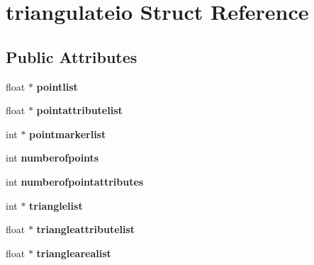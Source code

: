 \hypertarget{structtriangulateio}{\section{triangulateio Struct Reference}
\label{structtriangulateio}
}
\subsection*{Public Attributes}
\begin{DoxyCompactItemize}
\item 
\hypertarget{structtriangulateio_a82a64e7bbed8533faa445851f3d2e915}{float $\ast$ {\bfseries pointlist}}\label{structtriangulateio_a82a64e7bbed8533faa445851f3d2e915}

\item 
\hypertarget{structtriangulateio_ae2d48c6a745b2fb93430beb287373469}{float $\ast$ {\bfseries pointattributelist}}\label{structtriangulateio_ae2d48c6a745b2fb93430beb287373469}

\item 
\hypertarget{structtriangulateio_acb2a9792412a2c3051fb869e88cfa602}{int $\ast$ {\bfseries pointmarkerlist}}\label{structtriangulateio_acb2a9792412a2c3051fb869e88cfa602}

\item 
\hypertarget{structtriangulateio_a29be46ad3fc4f8c84235e420f7e606ec}{int {\bfseries numberofpoints}}\label{structtriangulateio_a29be46ad3fc4f8c84235e420f7e606ec}

\item 
\hypertarget{structtriangulateio_aaac6a34f7d7bf1d1476ce7672f15d976}{int {\bfseries numberofpointattributes}}\label{structtriangulateio_aaac6a34f7d7bf1d1476ce7672f15d976}

\item 
\hypertarget{structtriangulateio_a7d0f1c11cd6dc624ae61dbbbcc68b8cb}{int $\ast$ {\bfseries trianglelist}}\label{structtriangulateio_a7d0f1c11cd6dc624ae61dbbbcc68b8cb}

\item 
\hypertarget{structtriangulateio_a308a628907c92aff9d23da64895cf786}{float $\ast$ {\bfseries triangleattributelist}}\label{structtriangulateio_a308a628907c92aff9d23da64895cf786}

\item 
\hypertarget{structtriangulateio_ad05a9d4c4941dbdb8193cfedb289963a}{float $\ast$ {\bfseries trianglearealist}}\label{structtriangulateio_ad05a9d4c4941dbdb8193cfedb289963a}


\end{DoxyCompactItemize}
